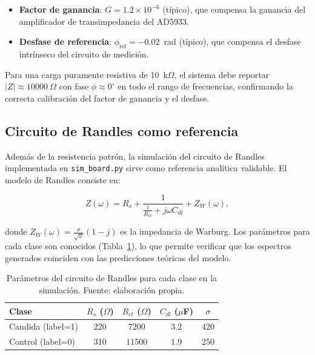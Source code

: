 \documentclass[11pt,a4paper,spanish]{book}
\begin{document}
\begin{itemize}
	\item \textbf{Factor de ganancia}: $G = 1.2 \times 10^{-6}$ (t\'{i}pico), que compensa la ganancia del amplificador de transimpedancia del AD5933.
	\item \textbf{Desfase de referencia}: $\phi_{\mathrm{ref}} = -0.02$~rad (t\'{i}pico), que compensa el desfase intr\'{i}nseco del circuito de medici\'{o}n.
\end{itemize}

Para una carga puramente resistiva de 10~k$\Omega$, el sistema debe reportar $|Z| \approx 10000~\Omega$ con fase $\phi \approx 0^\circ$ en todo el rango de frecuencias, confirmando la correcta calibraci\'{o}n del factor de ganancia y el desfase.

\subsection{Circuito de Randles como referencia}

Adem\'{a}s de la resistencia patr\'{o}n, la simulaci\'{o}n del circuito de Randles implementada en \texttt{sim\_board.py} sirve como referencia anal\'{i}tica validable. El modelo de Randles consiste en:

\begin{equation}
Z(\omega) = R_s + \frac{1}{\frac{1}{R_{ct}} + j\omega C_{dl}} + Z_W(\omega),
\label{eq:randles}
\end{equation}

donde $Z_W(\omega) = \frac{\sigma}{\sqrt{\omega}}(1-j)$ es la impedancia de Warburg. Los par\'{a}metros para cada clase son conocidos (Tabla~\ref{tab:randles-params}), lo que permite verificar que los espectros generados coinciden con las predicciones te\'{o}ricas del modelo.

\begin{table}[ht]
\centering
\begin{tabular}{l c c c c}
\hline\hline
Clase & $R_s$ ($\Omega$) & $R_{ct}$ ($\Omega$) & $C_{dl}$ ($\mu$F) & $\sigma$ \\ [0.5ex]
\hline
Candida (label=1) & 220 & 7200 & 3.2 & 420 \\
Control (label=0) & 310 & 11500 & 1.9 & 250 \\
\hline
\end{tabular}
\caption[Par\'{a}metros de Randles]{Par\'{a}metros del circuito de Randles para cada clase en la simulaci\'{o}n. Fuente: elaboraci\'{o}n propia.}
\label{tab:randles-params}
\end{table}
\end{document}
